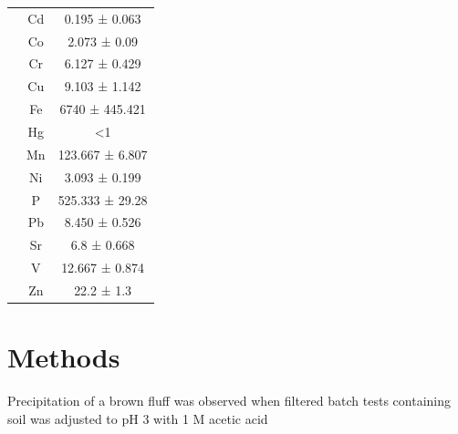 \begin{table}
\begin{tabular}{c|cc}
                                        & Cd                                     & 0.195 ± 0.063              \\
                                        & Co                                     & 2.073 ± 0.09               \\
                                        & Cr                                     & 6.127 ± 0.429              \\
                                        & Cu                                     & 9.103 ± 1.142              \\
                                        & Fe                                     & 6740 ± 445.421             \\
                                        & Hg                                     & \textless{}1             \\
                                        & Mn                                     & 123.667 ± 6.807            \\
                                        & Ni                                     & 3.093 ± 0.199              \\
                                        & P                                      & 525.333 ± 29.28           \\
                                        & Pb                                     & 8.450 ± 0.526               \\
                                        & Sr                                     & 6.8 ± 0.668                \\
                                        & V                                      & 12.667 ± 0.874             \\
                                        & Zn                                     & 22.2 ± 1.3                \\ \bottomrule
\end{tabular}
\end{table}
\section{Methods}
Precipitation of a brown fluff was observed when filtered batch tests containing soil was adjusted to pH 3 with 1 M acetic acid

